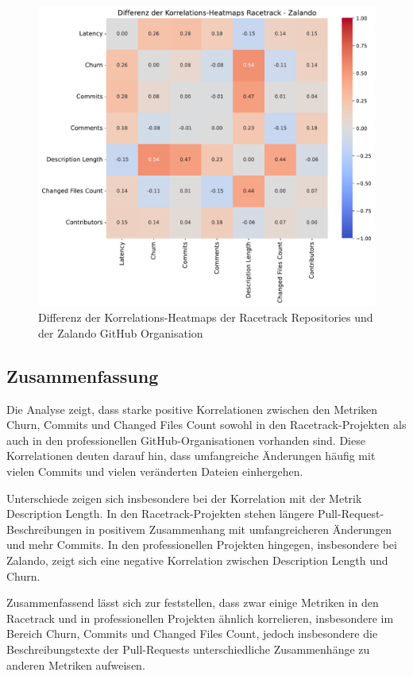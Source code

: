 \begin{figure}[ht]
\includegraphics[width=\textwidth]{Figures/diff-korrelationsmatrix-racetrack-zalando.pdf}
\caption{Differenz der Korrelations-Heatmaps der Racetrack Repositories und der Zalando GitHub Organisation}
\label{fig:diff-korrelationsmatrix-racetrack-zalando}
\end{figure}



\subsection{Zusammenfassung}
Die Analyse zeigt, dass starke positive Korrelationen zwischen den Metriken Churn, Commits und Changed Files Count sowohl in den Racetrack-Projekten als auch in den professionellen GitHub-Organisationen vorhanden sind. Diese Korrelationen deuten darauf hin, dass umfangreiche Änderungen häufig mit vielen Commits und vielen veränderten Dateien einhergehen.

Unterschiede zeigen sich insbesondere bei der Korrelation mit der Metrik Description Length. In den Racetrack-Projekten stehen längere Pull-Request-Beschreibungen in positivem Zusammenhang mit umfangreicheren Änderungen und mehr Commits. 
In den professionellen Projekten hingegen, insbesondere bei Zalando, zeigt sich eine negative Korrelation zwischen Description Length und Churn. 

Zusammenfassend lässt sich zur  feststellen, dass zwar einige Metriken in den Racetrack und in professionellen Projekten ähnlich korrelieren, insbesondere im Bereich Churn, Commits und Changed Files Count, jedoch insbesondere die Beschreibungstexte der Pull-Requests unterschiedliche Zusammenhänge zu anderen Metriken aufweisen.






